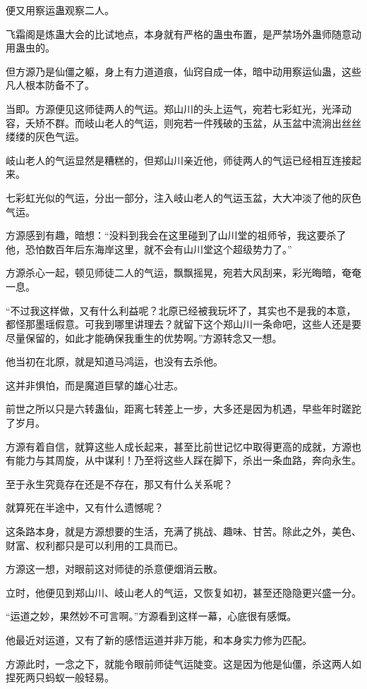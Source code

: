 \begin{this_body}
便又用察运蛊观察二人。

飞霜阁是炼蛊大会的比试地点，本身就有严格的蛊虫布置，是严禁场外蛊师随意动用蛊虫的。

但方源乃是仙僵之躯，身上有力道道痕，仙窍自成一体，暗中动用察运仙蛊，这些凡人根本防备不了。

当即。方源便见这师徒两人的气运。郑山川的头上运气，宛若七彩虹光，光泽动容，夭矫不群。而岐山老人的气运，则宛若一件残破的玉盆，从玉盆中流淌出丝丝缕缕的灰色气运。

岐山老人的气运显然是糟糕的，但郑山川亲近他，师徒两人的气运已经相互连接起来。

七彩虹光似的气运，分出一部分，注入岐山老人的气运玉盆，大大冲淡了他的灰色气运。

方源感到有趣，暗想：“没料到我会在这里碰到了山川堂的祖师爷，我这要杀了他，恐怕数百年后东海岸这里，就不会有山川堂这个超级势力了。”

方源杀心一起，顿见师徒二人的气运，飘飘摇晃，宛若大风刮来，彩光晦暗，奄奄一息。

“不过我这样做，又有什么利益呢？北原已经被我玩坏了，其实也不是我的本意，都怪那墨瑶假意。可我到哪里讲理去？就留下这个郑山川一条命吧，这些人还是要尽量保留的，如此才能确保我重生的优势啊。”方源转念又一想。

他当初在北原，就是知道马鸿运，也没有去杀他。

这并非惧怕，而是魔道巨擘的雄心壮志。

前世之所以只是六转蛊仙，距离七转差上一步，大多还是因为机遇，早些年时蹉跎了岁月。

方源有着自信，就算这些人成长起来，甚至比前世记忆中取得更高的成就，方源也有能力与其周旋，从中谋利！乃至将这些人踩在脚下，杀出一条血路，奔向永生。

至于永生究竟存在还是不存在，那又有什么关系呢？

就算死在半途中，又有什么遗憾呢？

这条路本身，就是方源想要的生活，充满了挑战、趣味、甘苦。除此之外，美色、财富、权利都只是可以利用的工具而已。

方源这一想，对眼前这对师徒的杀意便烟消云散。

立时，他便见到郑山川、岐山老人的气运，又恢复如初，甚至还隐隐更兴盛一分。

“运道之妙，果然妙不可言啊。”方源看到这样一幕，心底很有感慨。

他最近对运道，又有了新的感悟运道并非万能，和本身实力修为匹配。

方源此时，一念之下，就能令眼前师徒气运陡变。这是因为他是仙僵，杀这两人如捏死两只蚂蚁一般轻易。


\end{this_body}
